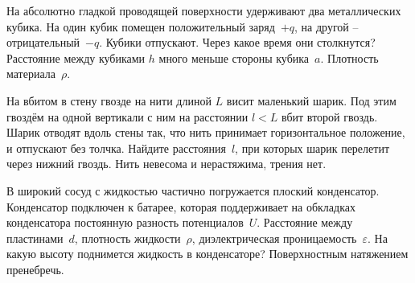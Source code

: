 \AddProb На абсолютно гладкой проводящей поверхности удерживают два металлических кубика. 
На один кубик помещен положительный заряд~$+q$, на другой -- отрицательный~$-q$. Кубики отпускают. Через какое время они столкнутся? 
Расстояние между кубиками $h$ много меньше стороны кубика~$a$. Плотность материала~$\rho$. 

\AddProb На вбитом в стену гвозде на нити длиной $L$ висит маленький шарик. 
Под этим гвоздём на одной вертикали с ним на расстоянии $l < L$ вбит второй гвоздь. 
Шарик отводят вдоль стены так, что нить принимает горизонтальное положение, и отпускают без толчка. 
Найдите расстояния~$l$, при которых шарик перелетит через нижний гвоздь. Нить невесома и нерастяжима, трения нет.

\AddProb В широкий сосуд с жидкостью частично погружается плоский конденсатор. 
Конденсатор подключен к батарее, которая поддерживает на обкладках конденсатора постоянную разность потенциалов~$U$. 
Расстояние между пластинами~$d$, плотность жидкости~$\rho$, диэлектрическая проницаемость~$\varepsilon$. 
На какую высоту поднимется жидкость в конденсаторе? Поверхностным натяжением пренебречь.